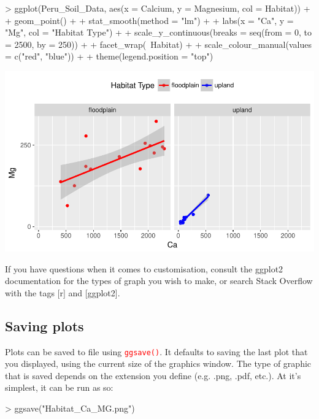 \documentclass[a4paper,12pt]{article}
\newcommand\code[1]{\textcolor{red}{\texttt{#1}}}
\begin{document}
\begin{shaded}
\begin{Schunk}
\begin{Sinput}
> ggplot(Peru_Soil_Data, aes(x = Calcium, y = Magnesium, col = Habitat)) +
+   geom_point() +
+   stat_smooth(method = "lm") +
+   labs(x = "Ca", y = "Mg", col = "Habitat Type") +
+   scale_y_continuous(breaks = seq(from = 0, to = 2500, by = 250)) +
+   facet_wrap(~Habitat) +
+   scale_colour_manual(values = c("red", "blue")) +
+   theme(legend.position = "top")
\end{Sinput}
\end{Schunk}
\includegraphics{3_Course_Notes-knitr-025}
\end{shaded}




If you have questions when it comes to customisation, consult the ggplot2 documentation for the types of graph you wish to make, or search Stack Overflow with the tags [r] and [ggplot2].

\subsection{Saving plots}

Plots can be saved to file using \code{ggsave()}. It defaults to saving the last plot that you displayed, using the current size of the graphics window. The type of graphic that is saved depends on the extension you define (e.g. .png, .pdf, etc.). At it's simplest, it can be run as so:

\begin{shaded}
\begin{Schunk}
\begin{Sinput}
> ggsave("Habitat_Ca_MG.png")
\end{Sinput}
\end{Schunk}
\end{shaded}
\end{document}
